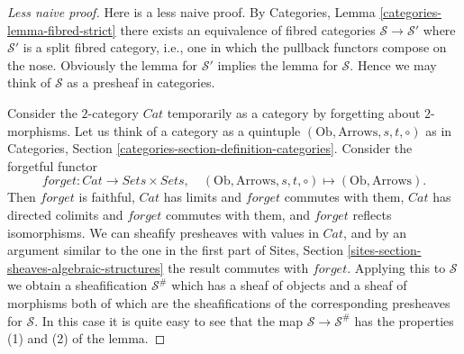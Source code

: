 \begin{proof}[Less naive proof]
Here is a less naive proof.
By Categories, Lemma \ref{categories-lemma-fibred-strict}
there exists an equivalence of
fibred categories $\mathcal{S} \to \mathcal{S}'$ where $\mathcal{S}'$
is a split fibred category, i.e., one in which the pullback
functors compose on the nose. Obviously the lemma for $\mathcal{S}'$
implies the lemma for $\mathcal{S}$. Hence we may think of $\mathcal{S}$
as a presheaf in categories.

\medskip\noindent
Consider the $2$-category $\textit{Cat}$ temporarily as a
category by forgetting about $2$-morphisms.
Let us think of a category as a quintuple
$(\text{Ob}, \text{Arrows}, s, t, \circ)$ as in
Categories, Section \ref{categories-section-definition-categories}.
Consider the forgetful functor
$$
forget : \textit{Cat} \to \textit{Sets} \times \textit{Sets}, \quad
(\text{Ob}, \text{Arrows}, s, t, \circ)
\mapsto
(\text{Ob}, \text{Arrows}).
$$
Then $forget$ is faithful, $\textit{Cat}$ has limits and
$forget$ commutes with them, $\textit{Cat}$ has directed colimits and
$forget$ commutes with them, and $forget$ reflects isomorphisms.
We can sheafify presheaves with values in $\textit{Cat}$, and
by an argument similar to the one in the first part of
Sites, Section \ref{sites-section-sheaves-algebraic-structures}
the result commutes with $forget$. Applying this to
$\mathcal{S}$ we obtain a sheafification $\mathcal{S}^\#$
which has a sheaf of objects and a sheaf of morphisms
both of which are the sheafifications of the corresponding
presheaves for $\mathcal{S}$. In this case it is quite
easy to see that the map $\mathcal{S} \to \mathcal{S}^\#$
has the properties (1) and (2) of the lemma.


\end{proof}

